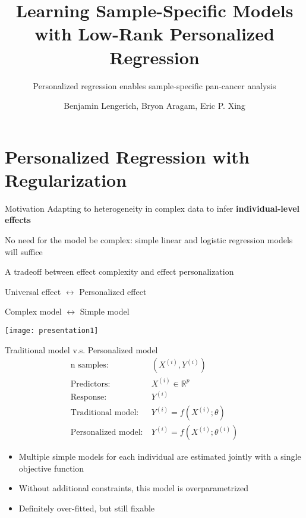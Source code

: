 \documentclass[
  10pt,
  ignorenonframetext,
]{beamer}
\title{Learning Sample-Specific Models with Low-Rank Personalized
Regression}
\subtitle{Personalized regression enables sample-specific pan-cancer
analysis}
\author{Benjamin Lengerich, Bryon Aragam, Eric P. Xing}
\date{}
\institute{Carnegie Mellon University, University of Chicago}
\providecommand{\tightlist}{%
  \setlength{\itemsep}{0pt}\setlength{\parskip}{0pt}}
\begin{document}
\frame{\titlepage}

\hypertarget{personalized-regression-with-regularization}{%
\section{Personalized Regression with
Regularization}\label{personalized-regression-with-regularization}}

\begin{frame}{Motivation}
\protect\hypertarget{motivation}{}
Adapting to heterogeneity in complex data to infer
\textbf{individual-level effects}

No need for the model be complex: simple linear and logistic regression
models will suffice

\begin{block}{A tradeoff between effect complexity and effect
personalization}
\protect\hypertarget{a-tradeoff-between-effect-complexity-and-effect-personalization}{}
\centering

Universal effect \(\leftrightarrow\) Personalized effect

\centering

Complex model \(\leftrightarrow\) Simple model

\begin{center}\texttt{[image: presentation1]} \end{center}
\end{block}
\end{frame}

\begin{frame}{Traditional model v.s. Personalized model}
\protect\hypertarget{traditional-model-v.s.-personalized-model}{}
\[
\begin{split}
\text {n samples:} & \ (X^{(i)}, Y^{(i)})\\
\text {Predictors:} & \ X^{(i)} \in \mathbb R^p\\
\text {Response:} & \ Y^{(i)} \\
\text {Traditional model:} & \ Y^{(i)} = f(X^{(i)}; \theta)\\
\text {Personalized model:} & \ Y^{(i)} = f(X^{(i)}; \theta^{(i)})
\end{split}
\]

\begin{itemize}
\tightlist
\item
  Multiple simple models for each individual are estimated jointly with
  a single objective function
\item
  Without additional constraints, this model is overparametrized
\item
  Definitely over-fitted, but still fixable
\end{itemize}
\end{frame}
\end{document}
